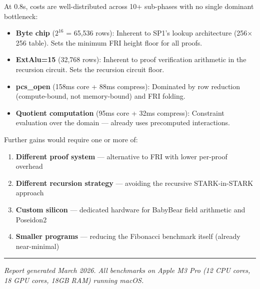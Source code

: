 \documentclass[11pt,a4paper]{article}
\begin{document}
At 0.8s, costs are well-distributed across 10+ sub-phases with no single dominant bottleneck:

\begin{itemize}[nosep]
    \item \textbf{Byte chip} ($2^{16}$ = 65,536 rows): Inherent to SP1's lookup architecture (256$\times$256 table). Sets the minimum FRI height floor for all proofs.
    \item \textbf{ExtAlu=15} (32,768 rows): Inherent to proof verification arithmetic in the recursion circuit. Sets the recursion circuit floor.
    \item \textbf{pcs\_open} (158ms core + 88ms compress): Dominated by row reduction (compute-bound, not memory-bound) and FRI folding.
    \item \textbf{Quotient computation} (95ms core + 32ms compress): Constraint evaluation over the domain --- already uses precomputed interactions.
\end{itemize}

Further gains would require one or more of:

\begin{enumerate}[nosep]
    \item \textbf{Different proof system} --- alternative to FRI with lower per-proof overhead
    \item \textbf{Different recursion strategy} --- avoiding the recursive STARK-in-STARK approach
    \item \textbf{Custom silicon} --- dedicated hardware for BabyBear field arithmetic and Poseidon2
    \item \textbf{Smaller programs} --- reducing the Fibonacci benchmark itself (already near-minimal)
\end{enumerate}

\vspace{1em}
\noindent\rule{\textwidth}{0.4pt}
\vspace{0.5em}
\noindent\textit{Report generated March 2026. All benchmarks on Apple M3 Pro (12 CPU cores, 18 GPU cores, 18GB RAM) running macOS.}
\end{document}
